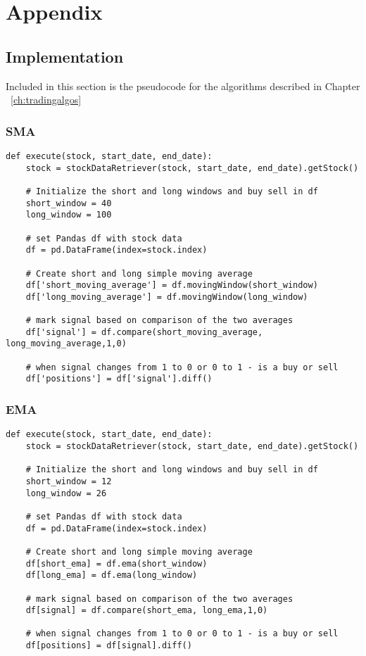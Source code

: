 \documentclass[../thesis.tex]{subfiles}
\begin{document}
\chapter{Appendix}
\label{ch:append}

\section{Implementation}

Included in this section is the pseudocode for the algorithms described in Chapter ~\ref{ch:tradingalgos}

\subsection{SMA}

\begin{verbatim}
def execute(stock, start_date, end_date):
    stock = stockDataRetriever(stock, start_date, end_date).getStock()

    # Initialize the short and long windows and buy sell in df
    short_window = 40
    long_window = 100
    
    # set Pandas df with stock data
    df = pd.DataFrame(index=stock.index)

    # Create short and long simple moving average 
    df['short_moving_average'] = df.movingWindow(short_window)
    df['long_moving_average'] = df.movingWindow(long_window)
    
    # mark signal based on comparison of the two averages
    df['signal'] = df.compare(short_moving_average, long_moving_average,1,0)
    
    # when signal changes from 1 to 0 or 0 to 1 - is a buy or sell
    df['positions'] = df['signal'].diff()

\end{verbatim}

\subsection{EMA }

\begin{verbatim}
def execute(stock, start_date, end_date):
    stock = stockDataRetriever(stock, start_date, end_date).getStock()

    # Initialize the short and long windows and buy sell in df
    short_window = 12
    long_window = 26

    # set Pandas df with stock data
    df = pd.DataFrame(index=stock.index)

    # Create short and long simple moving average
    df[short_ema] = df.ema(short_window)
    df[long_ema] = df.ema(long_window)

    # mark signal based on comparison of the two averages
    df[signal] = df.compare(short_ema, long_ema,1,0)

    # when signal changes from 1 to 0 or 0 to 1 - is a buy or sell
    df[positions] = df[signal].diff()

\end{verbatim}
\end{document}
